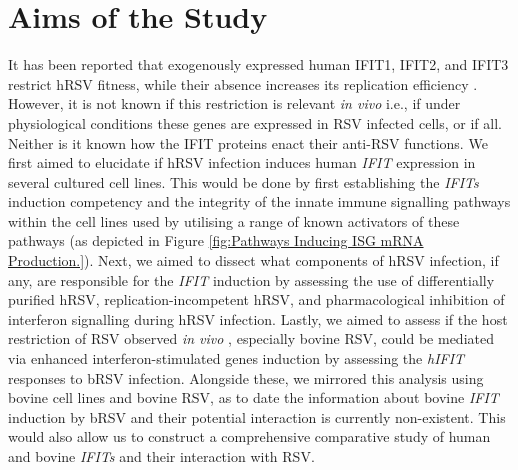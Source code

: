 \section{Aims of the Study} \label{sec:Aims}
It has been reported that exogenously expressed human IFIT1, IFIT2, and IFIT3 restrict hRSV fitness, while their absence increases its replication efficiency \cite{Drori2020InfluenzaProteins}. However, it is not known if this restriction is relevant \textit{in vivo} i.e., if under physiological conditions these genes are expressed in RSV infected cells, or if all. Neither is it known how the IFIT proteins enact their anti-RSV functions. We first aimed to elucidate if hRSV infection induces human \textit{IFIT} expression in several cultured cell lines. This would be done by first establishing the \textit{IFITs} induction competency and the integrity of the innate immune signalling pathways within the cell lines used by utilising a range of known activators of these pathways (as depicted in Figure \ref{fig:Pathways Inducing ISG mRNA Production.}). Next, we aimed to dissect what components of hRSV infection, if any, are responsible for the \textit{IFIT} induction by assessing the use of differentially purified hRSV, replication-incompetent hRSV, and pharmacological inhibition of interferon signalling during hRSV infection. Lastly, we aimed to assess if the host restriction of RSV observed \textit{in vivo} \cite{Nair2013GlobalAnalysis, Sacco2014RespiratoryCattle}, especially bovine RSV, could be mediated via enhanced interferon-stimulated genes induction by assessing the \textit{hIFIT} responses to bRSV infection. Alongside these, we mirrored this analysis using bovine cell lines and bovine RSV, as to date the information about bovine \textit{IFIT} induction by bRSV and their potential interaction is currently non-existent. This would also allow us to construct a comprehensive comparative study of human and bovine \textit{IFITs} and their interaction with RSV.

